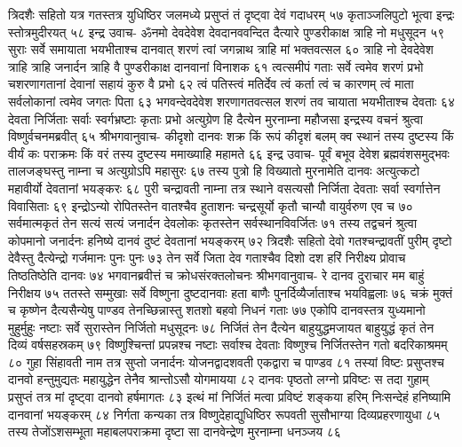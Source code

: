त्रिदशैः सहितो यत्र गतस्तत्र युधिष्ठिर 
जलमध्ये प्रसुप्तं तं दृष्ट्वा देवं गदाधरम् ५७
कृताञ्जलिपुटो भूत्वा इन्द्रः स्तोत्रमुदीरयत् ५८
इन्द्र उवाच-
ॐनमो देवदेवेश देवदानववन्दित 
दैत्यारे पुण्डरीकाक्ष त्राहि नो मधुसूदन ५९
सुराः सर्वे समायाता भयभीताश्च दानवात् 
शरणं त्वां जगन्नाथ त्राहि मां भक्तवत्सल ६०
त्राहि नो देवदेवेश त्राहि त्राहि जनार्दन 
त्राहि वै पुण्डरीकाक्ष दानवानां विनाशक ६१
त्वत्समीपं गताः सर्वे त्वमेव शरणं प्रभो 
चशरणागतानां देवानां सहायं कुरु वै प्रभो ६२
त्वं पतिस्त्वं मतिर्देव त्वं कर्ता त्वं च कारणम् 
त्वं माता सर्वलोकानां त्वमेव जगतः पिता ६३
भगवन्देवदेवेश शरणागतवत्सल 
शरणं तव चायाता भयभीताश्च देवताः ६४
देवता निर्जिताः सर्वाः स्वर्गभ्रष्टाः कृताः प्रभो 
अत्युग्रेण हि दैत्येन मुरनाम्ना महौजसा 
इन्द्रस्य वचनं श्रुत्वा विष्णुर्वचनमब्रवीत् ६५
श्रीभगवानुवाच-
कीदृशो दानवः शक्र किं रूपं कीदृशं बलम् 
क्व स्थानं तस्य दुष्टस्य किं वीर्यं कः पराक्रमः 
किं वरं तस्य दुष्टस्य ममाख्याहि महामते ६६
इन्द्र उवाच-
पूर्वं बभूव देवेश ब्रह्मवंशसमुद्भवः 
तालजङ्घस्तु नाम्ना च अत्युग्रोऽपि महासुरः ६७
तस्य पुत्रो हि विख्यातो मुरनामेति दानवः 
अत्युत्कटो महावीर्यो देवतानां भयङ्करः ६८
पुरी चन्द्रावती नाम्ना तत्र स्थाने वसत्यसौ 
निर्जिता देवताः सर्वा स्वर्गात्तेन विवासिताः ६९
इन्द्रोऽन्यो रोपितस्तेन वातश्चैव हुताशनः 
चन्द्रसूर्यो कृतौ चान्यौ वायुर्वरुण एव च ७०
सर्वमात्मकृतं तेन सत्यं सत्यं जनार्दन 
देवलोकः कृतस्तेन सर्वस्थानविवर्जितः ७१
तस्य तद्वचनं श्रुत्वा कोपमानो जनार्दनः 
हनिष्ये दानवं दुष्टं देवतानां भयङ्करम् ७२
त्रिदशैः सहितो देवो गतश्चन्द्रावतीं पुरीम् 
दृष्टो देवैस्तु दैत्येन्द्रो गर्जमानः पुनः पुनः ७३
तेन सर्वे जिता देव गताश्चैव दिशो दश 
हरिं निरीक्ष्य प्रोवाच तिष्ठतिष्ठेति दानवः ७४
भगवानब्रवीत्तं च क्रोधसंरक्तलोचनः 
श्रीभगवानुवाच-
रे दानव दुराचार मम बाहुं निरीक्षय ७५
ततस्ते सम्मुखाः सर्वे विष्णुना दुष्टदानवाः 
हता बाणैः पुनर्दिव्यैर्जाताश्च भयविह्वलाः ७६
चक्रं मुक्तं च कृष्णेन दैत्यसैन्येषु पाण्डव 
तेनच्छिन्नास्तु शतशो बहवो निधनं गताः ७७
एकोपि दानवस्तत्र युध्यमानो मुहुर्मुहुः 
नष्टाः सर्वे सुरास्तेन निर्जितो मधुसूदनः ७८
निर्जितं तेन दैत्येन बाहुयुद्धमजायत 
बाहुयुद्धं कृतं तेन दिव्यं वर्षसहस्रकम् ७९
विष्णुश्चिन्तां प्रपन्नश्च नष्टाः सर्वाश्च देवताः 
विष्णुश्च निर्जितस्तेन गतो बदरिकाश्रमम् ८०
गुहा सिंहावती नाम तत्र सुप्तो जनार्दनः 
योजनद्वादशवती एकद्वारा च पाण्डव ८१
तस्यां विष्टः प्रसुप्तश्च दानवो हन्तुमुद्यतः 
महायुद्धेन तेनैव श्रान्तोऽसौ योगमायया ८२
दानवः पृष्ठतो लग्नो प्रविष्टः स तदा गुहाम् 
प्रसुप्तं तत्र मां दृष्ट्वा दानवो हर्षमागतः ८३
इत्थं मां निर्जितं मत्वा प्रविष्टं शङ्कया हरिम् 
निःसन्देहं हनिष्यामि दानवानां भयङ्करम् ८४
निर्गता कन्यका तत्र विष्णुदेहाद्युधिष्ठिर 
रूपवती सुसौभाग्या दिव्यप्रहरणायुधा ८५
तस्य तेजोंऽशसम्भूता महाबलपराक्रमा 
दृष्टा सा दानवेन्द्रेण मुरनाम्ना धनञ्जय ८६
